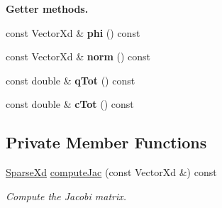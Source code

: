 \begin{Indent}{\bf Getter methods.}\par
\begin{DoxyCompactItemize}
\item 
\hypertarget{classNonLinearPoisson1D_acbe945a7e028306e53fa2b121ddadc7a}{const Vector\-Xd \& {\bfseries phi} () const }\label{classNonLinearPoisson1D_acbe945a7e028306e53fa2b121ddadc7a}

\item 
\hypertarget{classNonLinearPoisson1D_a690be2163ccaff066191959fd1f413ed}{const Vector\-Xd \& {\bfseries norm} () const }\label{classNonLinearPoisson1D_a690be2163ccaff066191959fd1f413ed}

\item 
\hypertarget{classNonLinearPoisson1D_ad8d751396b67e23d237e90b7072a1db2}{const double \& {\bfseries q\-Tot} () const }\label{classNonLinearPoisson1D_ad8d751396b67e23d237e90b7072a1db2}

\item 
\hypertarget{classNonLinearPoisson1D_a01d78f24af67b4721fa1fe3c456285d8}{const double \& {\bfseries c\-Tot} () const }\label{classNonLinearPoisson1D_a01d78f24af67b4721fa1fe3c456285d8}

\end{DoxyCompactItemize}
\end{Indent}
\subsection*{Private Member Functions}
\begin{DoxyCompactItemize}
\item 
\hyperlink{typedefs_8h_a86edf437f454f4dd79d5422366403b7f}{Sparse\-Xd} \hyperlink{classNonLinearPoisson1D_a68da1b47bb6eb20a50057e8b35a4c09f}{compute\-Jac} (const Vector\-Xd \&) const 
\begin{DoxyCompactList}\small\item\em Compute the Jacobi matrix. \end{DoxyCompactList}\end{DoxyCompactItemize}
